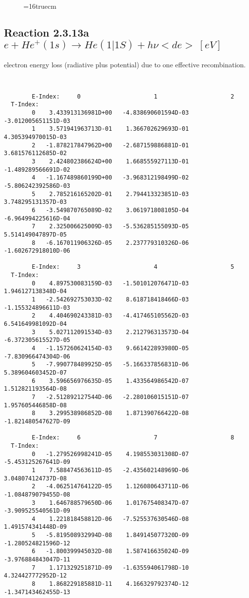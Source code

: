 \documentclass[12pt]{article}
\begin{document}
\begin{figure} \label{2.3.9aec}
\epsfxsize=16truecm
\end{figure}
\newpage



\subsection{
Reaction 2.3.13a $e + He^+(1s) \rightarrow   He(1|1S)+ h\nu  <de> \
[eV]$ }


  electron energy loss (radiative plus potential) due to one effective
recombination.

\begin{small}\begin{verbatim}


        E-Index:     0                     1                     2
  T-Index:
        0    3.433913136981D+00   -4.838690601594D-03   -3.012005651151D-03
        1    3.571941963713D-01    1.366702629693D-01    4.305394970015D-03
        2   -1.878217847962D+00   -2.687159886881D-01    3.681576112685D-02
        3    2.424802386624D+00    1.668555927113D-01   -1.489289566691D-02
        4   -1.167489860199D+00   -3.968312198499D-02   -5.806242392586D-03
        5    2.785216165202D-01    2.794413323851D-03    3.748295131357D-03
        6   -3.549870765089D-02    3.061971808105D-04   -6.964994225616D-04
        7    2.325006625009D-03   -5.536285155093D-05    5.514149047897D-05
        8   -6.167011906326D-05    2.237779310326D-06   -1.602672918010D-06

        E-Index:     3                     4                     5
  T-Index:
        0    4.897530083159D-03   -1.501012076471D-03    1.946127138348D-04
        1   -2.542692753033D-02    8.618718418466D-03   -1.155324896611D-03
        2    4.404690243381D-03   -4.417465105562D-03    6.541649981092D-04
        3    5.027112091534D-03    2.212796313573D-04   -6.372305615527D-05
        4   -1.157260624154D-03    9.661422893980D-05   -7.830966474304D-06
        5   -7.990778489925D-05   -5.166337856831D-06    5.389604603452D-07
        6    3.596656976635D-05    1.433564986542D-07    1.512821193564D-08
        7   -2.512892127544D-06   -2.280106015151D-07    1.957605446858D-08
        8    3.299538986852D-08    1.871390766422D-08   -1.821480547627D-09

        E-Index:     6                     7                     8
  T-Index:
        0   -1.279526998241D-05    4.198553031308D-07   -5.453125267641D-09
        1    7.588474563611D-05   -2.435602148969D-06    3.048074124737D-08
        2   -4.062514764122D-05    1.126080643711D-06   -1.084879079455D-08
        3    1.646788579650D-06    1.017675408347D-07   -3.909525540561D-09
        4    1.221818458812D-06   -7.525537630546D-08    1.491574341448D-09
        5   -5.819508932994D-08    1.849145077320D-09   -1.280524821596D-12
        6   -1.800399945032D-08    1.587416635024D-09   -3.976884843047D-11
        7    1.171329251871D-09   -1.635594061798D-10    4.324427772952D-12
        8    1.868229185881D-11    4.166329792374D-12   -1.347143462455D-13


\end{verbatim}
\end{small}
\end{document}
